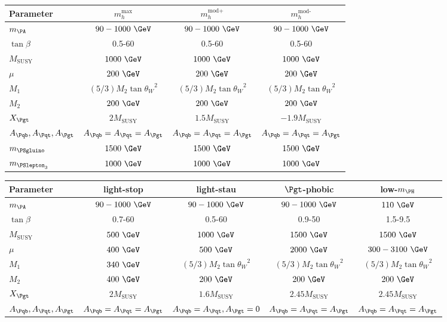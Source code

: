 \begin{table}[tbh]
\begin{tabular}{|l|c|c|c|}
\hline
Parameter & $m_{h}^{\text{max}}$ & $m_{h}^{\text{mod+}}$ & $m_{h}^{\text{mod-}}$ \\
\hline
$m_{\PA}$ & $90-1000~\GeV$ & $90-1000~\GeV$ & $90-1000~\GeV$\\
$\tan\beta$ & 0.5-60 & 0.5-60 & 0.5-60 \\
$M_{\text{SUSY}}$ & $1000~\GeV$ & $1000~\GeV$ & $1000~\GeV$\\
$\mu$ & $200~\GeV$ & $200~\GeV$ & $200~\GeV$\\
$M_{1}$ & $(5/3)M_{2}\tan{\theta_{W}}^{2}$ & $(5/3)M_{2}\tan{\theta_{W}}^{2}$ & $(5/3)M_{2}\tan{\theta_{W}}^{2}$\\
$M_{2}$ & $200~\GeV$ & $200~\GeV$ & $200~\GeV$ \\
$X_{\Pgt}$ & $2M_{\text{SUSY}}$ & $1.5M_{\text{SUSY}}$ & $-1.9M_{\text{SUSY}}$ \\
$A_{\Pqb},A_{\Pqt},A_{\Pgt}$ & $A_{\Pqb} = A_{\Pqt} = A_{\Pgt}$ & $A_{\Pqb} = A_{\Pqt} = A_{\Pgt}$ & $A_{\Pqb} = A_{\Pqt} = A_{\Pgt}$\\
$m_{\PSgluino}$ & $1500~\GeV$ & $1500~\GeV$ & $1500~\GeV$\\
$m_{\PSlepton_{3}}$ & $1000~\GeV$ & $1000~\GeV$ & $1000~\GeV$\\
\hline
\end{tabular}
\begin{tabular}{|l|c|c|c|c|}
\hline
Parameter & light-stop & light-stau & $\Pgt$-phobic & low-$m_{\PH}$ \\
\hline
$m_{\PA}$ & $90-1000~\GeV$ & $90-1000~\GeV$ & $90-1000~\GeV$ & $110~\GeV$\\
$\tan\beta$ & 0.7-60 & 0.5-60 & 0.9-50 & 1.5-9.5\\
$M_{\text{SUSY}}$ & $500~\GeV$ & $1000~\GeV$ & $1500~\GeV$ & $1500~\GeV$\\
$\mu$ & $400~\GeV$ & $500~\GeV$ & $2000~\GeV$ & $300-3100~\GeV$\\
$M_{1}$ & $340~\GeV$ & $(5/3)M_{2}\tan{\theta_{W}}^{2}$ & $(5/3)M_{2}\tan{\theta_{W}}^{2}$  & $(5/3)M_{2}\tan{\theta_{W}}^{2}$ \\
$M_{2}$ & $400~\GeV$ & $200~\GeV$ & $200~\GeV$ & $200~\GeV$\\
$X_{\Pgt}$ & $2M_{\text{SUSY}}$ & $1.6M_{\text{SUSY}}$ & $2.45M_{\text{SUSY}}$ & $2.45M_{\text{SUSY}}$ \\
$A_{\Pqb},A_{\Pqt},A_{\Pgt}$ & $A_{\Pqb} = A_{\Pqt} = A_{\Pgt}$ & $A_{\Pqb} = A_{\Pqt}, A_{\Pgt} = 0$ & $A_{\Pqb} = A_{\Pqt} = A_{\Pgt}$ & $A_{\Pqb} = A_{\Pqt} = A_{\Pgt}$ \\

\end{tabular}
\end{table}
